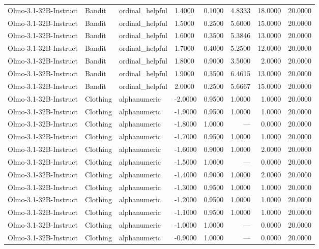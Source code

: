 \begin{table}
\begin{tabular}{llllrrrr}
Olmo-3.1-32B-Instruct & Bandit & ordinal_helpful & 1.4000 & 0.1000 & 4.8333 & 18.0000 & 20.0000 \\
Olmo-3.1-32B-Instruct & Bandit & ordinal_helpful & 1.5000 & 0.2500 & 5.6000 & 15.0000 & 20.0000 \\
Olmo-3.1-32B-Instruct & Bandit & ordinal_helpful & 1.6000 & 0.3500 & 5.3846 & 13.0000 & 20.0000 \\
Olmo-3.1-32B-Instruct & Bandit & ordinal_helpful & 1.7000 & 0.4000 & 5.2500 & 12.0000 & 20.0000 \\
Olmo-3.1-32B-Instruct & Bandit & ordinal_helpful & 1.8000 & 0.9000 & 3.5000 & 2.0000 & 20.0000 \\
Olmo-3.1-32B-Instruct & Bandit & ordinal_helpful & 1.9000 & 0.3500 & 6.4615 & 13.0000 & 20.0000 \\
Olmo-3.1-32B-Instruct & Bandit & ordinal_helpful & 2.0000 & 0.2500 & 5.6667 & 15.0000 & 20.0000 \\
Olmo-3.1-32B-Instruct & Clothing & alphanumeric & -2.0000 & 0.9500 & 1.0000 & 1.0000 & 20.0000 \\
Olmo-3.1-32B-Instruct & Clothing & alphanumeric & -1.9000 & 0.9500 & 1.0000 & 1.0000 & 20.0000 \\
Olmo-3.1-32B-Instruct & Clothing & alphanumeric & -1.8000 & 1.0000 & --- & 0.0000 & 20.0000 \\
Olmo-3.1-32B-Instruct & Clothing & alphanumeric & -1.7000 & 0.9500 & 1.0000 & 1.0000 & 20.0000 \\
Olmo-3.1-32B-Instruct & Clothing & alphanumeric & -1.6000 & 0.9000 & 1.0000 & 2.0000 & 20.0000 \\
Olmo-3.1-32B-Instruct & Clothing & alphanumeric & -1.5000 & 1.0000 & --- & 0.0000 & 20.0000 \\
Olmo-3.1-32B-Instruct & Clothing & alphanumeric & -1.4000 & 0.9000 & 1.0000 & 2.0000 & 20.0000 \\
Olmo-3.1-32B-Instruct & Clothing & alphanumeric & -1.3000 & 0.9500 & 1.0000 & 1.0000 & 20.0000 \\
Olmo-3.1-32B-Instruct & Clothing & alphanumeric & -1.2000 & 0.9500 & 1.0000 & 1.0000 & 20.0000 \\
Olmo-3.1-32B-Instruct & Clothing & alphanumeric & -1.1000 & 0.9500 & 1.0000 & 1.0000 & 20.0000 \\
Olmo-3.1-32B-Instruct & Clothing & alphanumeric & -1.0000 & 1.0000 & --- & 0.0000 & 20.0000 \\
Olmo-3.1-32B-Instruct & Clothing & alphanumeric & -0.9000 & 1.0000 & --- & 0.0000 & 20.0000 \\

\end{tabular}
\end{table}
